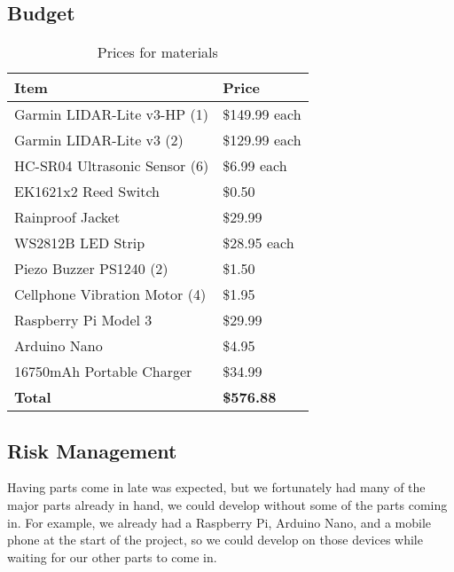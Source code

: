 \documentclass[journal]{IEEEtran}
\begin{document}
\subsection{Budget}
\begin{table}[H]
    \centering
    \begin{tabularx}{0.4\textwidth}{ll}
        \toprule
         \textbf{Item}  & \textbf{Price}  \\
         \midrule
         Garmin LIDAR-Lite v3-HP (1)    & \$149.99 each\\
         Garmin LIDAR-Lite v3 (2)       & \$129.99 each\\
         HC-SR04 Ultrasonic Sensor (6)  & \$6.99 each\\
         EK1621x2 Reed Switch           & \$0.50\\
         
         Rainproof Jacket               & \$29.99\\
         WS2812B LED Strip              & \$28.95 each\\
         Piezo Buzzer PS1240 (2)        & \$1.50\\
         Cellphone Vibration Motor (4)  & \$1.95\\
         
         Raspberry Pi Model 3           & \$29.99\\
         Arduino Nano                   & \$4.95\\
         
         16750mAh Portable Charger      & \$34.99\\
         \midrule
         \textbf{Total} & \textbf{\$576.88}\\
         \toprule
    \end{tabularx}
    \caption{Prices for materials}
    \label{tab:prices}
\end{table}

\subsection{Risk Management}
Having parts come in late was expected, but we fortunately had many of the major parts already in hand, we could develop without some of the parts coming in. For example, we already had a Raspberry Pi, Arduino Nano, and a mobile phone at the start of the project, so we could develop on those devices while waiting for our other parts to come in. 
\end{document}
